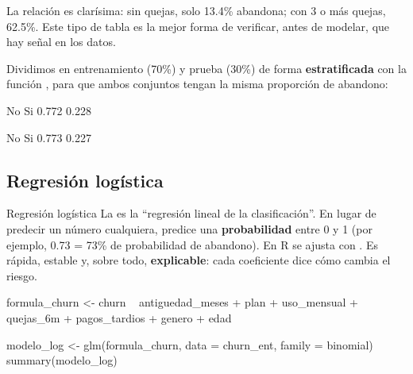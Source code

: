 La relación es clarísima: sin quejas, solo 13.4\% abandona; con 3 o más
quejas, 62.5\%. Este tipo de tabla es la mejor forma de verificar, antes de
modelar, que hay señal en los datos.

Dividimos en entrenamiento (70\%) y prueba (30\%) de forma
\textbf{estratificada} con la función , para que ambos
conjuntos tengan la misma proporción de abandono:


\begin{rsalida}

   No    Si 
0.772 0.228 

   No    Si 
0.773 0.227 
\end{rsalida}

\subsection{Regresión logística}

\begin{concepto}{Regresión logística}
La  es la ``regresión lineal de la
clasificación''. En lugar de predecir un número cualquiera, predice una
\textbf{probabilidad} entre 0 y 1 (por ejemplo, 0.73 = 73\% de probabilidad de
abandono). En R se ajusta con . Es rápida,
estable y, sobre todo, \textbf{explicable}: cada coeficiente dice cómo cambia
el riesgo.
\end{concepto}

\begin{rcode}
formula_churn <- churn ~ antiguedad_meses + plan + uso_mensual +
  quejas_6m + pagos_tardios + genero + edad

modelo_log <- glm(formula_churn, data = churn_ent, family = binomial)
summary(modelo_log)
\end{rcode}

